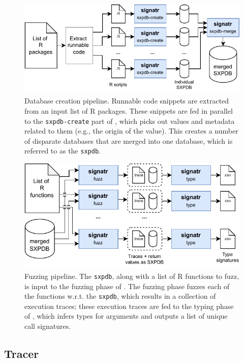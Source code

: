 \documentclass[sigplan,anonymous,review]{acmart}
\begin{document}
\begin{figure}
    \centering
    \includegraphics[width=\columnwidth]{code-and-figures/sxdb-pipeline.pdf}
    \caption{
    Database creation pipeline.
    Runnable code snippets are extracted from an input list of R packages.
    These snippets are fed in parallel to the {\tt sxpdb-create} part of \tool, which picks out values and metadata related to them (e.g., the origin of the value). 
    This creates a number of disparate databases that are merged into one database, which is referred to as the {\tt sxpdb}.
    }\label{fig:sxpdb-pipeline}
\end{figure}

\begin{figure}
    \centering
    \includegraphics[width=\columnwidth]{code-and-figures/fuzz-pipeline.pdf}
    \caption{
    Fuzzing pipeline.
    The {\tt sxpdb}, along with a list of R functions to fuzz, is input to the fuzzing phase of \tool.
    The fuzzing phase fuzzes each of the functions w.r.t. the {\tt sxpdb}, which results in a collection of execution traces; these execution traces are fed to the typing phase of \tool, which infers types for arguments and outputs a list of unique call signatures.
    }\label{fig:fuzz-pipeline}
\end{figure}

\subsection{Tracer}
\end{document}
